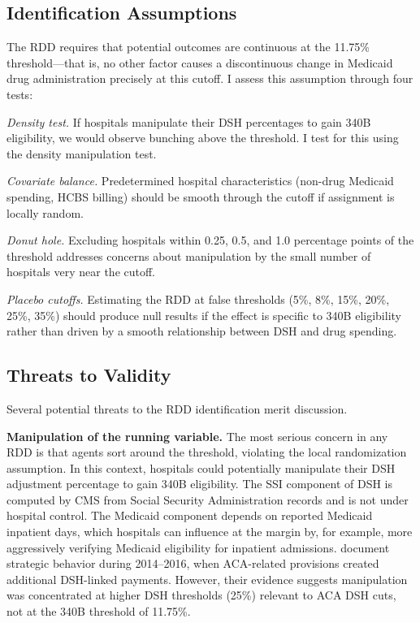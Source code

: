 \documentclass[12pt]{article}
\begin{document}
\subsection{Identification Assumptions}

The RDD requires that potential outcomes are continuous at the 11.75\% threshold---that is, no other factor causes a discontinuous change in Medicaid drug administration precisely at this cutoff. I assess this assumption through four tests:

\textit{Density test.} If hospitals manipulate their DSH percentages to gain 340B eligibility, we would observe bunching above the threshold. I test for this using the \citet{cattaneo2020simple} density manipulation test.

\textit{Covariate balance.} Predetermined hospital characteristics (non-drug Medicaid spending, HCBS billing) should be smooth through the cutoff if assignment is locally random.

\textit{Donut hole.} Excluding hospitals within 0.25, 0.5, and 1.0 percentage points of the threshold addresses concerns about manipulation by the small number of hospitals very near the cutoff.

\textit{Placebo cutoffs.} Estimating the RDD at false thresholds (5\%, 8\%, 15\%, 20\%, 25\%, 35\%) should produce null results if the effect is specific to 340B eligibility rather than driven by a smooth relationship between DSH and drug spending.

\subsection{Threats to Validity}

Several potential threats to the RDD identification merit discussion.

\textbf{Manipulation of the running variable.} The most serious concern in any RDD is that agents sort around the threshold, violating the local randomization assumption. In this context, hospitals could potentially manipulate their DSH adjustment percentage to gain 340B eligibility. The SSI component of DSH is computed by CMS from Social Security Administration records and is not under hospital control. The Medicaid component depends on reported Medicaid inpatient days, which hospitals can influence at the margin by, for example, more aggressively verifying Medicaid eligibility for inpatient admissions. \citet{bai2021strategic} document strategic behavior during 2014--2016, when ACA-related provisions created additional DSH-linked payments. However, their evidence suggests manipulation was concentrated at higher DSH thresholds (25\%) relevant to ACA DSH cuts, not at the 340B threshold of 11.75\%.
\end{document}
